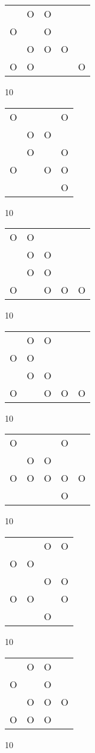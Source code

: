 \begin{tabular}{|m{0.2cm}m{0.2cm}m{0.2cm}m{0.2cm}m{0.2cm}|}\hline
 &O&O& & \\
O& &O& & \\
 &O&O&O& \\
O&O& & &O\\
\hline\end{tabular}10
\begin{tabular}{|m{0.2cm}m{0.2cm}m{0.2cm}m{0.2cm}|}\hline
O& & &O\\
 &O&O& \\
 &O& &O\\
O& &O&O\\
 & & &O\\
\hline\end{tabular}10
\begin{tabular}{|m{0.2cm}m{0.2cm}m{0.2cm}m{0.2cm}m{0.2cm}|}\hline
O&O& & & \\
 &O&O& & \\
 &O&O& & \\
O& &O&O&O\\
\hline\end{tabular}10
\begin{tabular}{|m{0.2cm}m{0.2cm}m{0.2cm}m{0.2cm}m{0.2cm}|}\hline
 &O&O& & \\
O&O& & & \\
 &O&O& & \\
O& &O&O&O\\
\hline\end{tabular}10
\begin{tabular}{|m{0.2cm}m{0.2cm}m{0.2cm}m{0.2cm}m{0.2cm}|}\hline
O& & &O& \\
 &O&O& & \\
O&O&O&O&O\\
 & & &O& \\
\hline\end{tabular}10
\begin{tabular}{|m{0.2cm}m{0.2cm}m{0.2cm}m{0.2cm}|}\hline
 & &O&O\\
O&O& & \\
 & &O&O\\
O&O& &O\\
 & &O& \\
\hline\end{tabular}10
\begin{tabular}{|m{0.2cm}m{0.2cm}m{0.2cm}m{0.2cm}|}\hline
 &O&O& \\
O& &O& \\
 &O&O&O\\
O&O&O& \\
\hline\end{tabular}10
